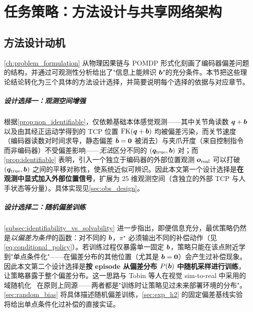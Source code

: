 
\chapter{任务策略：方法设计与共享网络架构}\label{ch:task_policy}

\section{方法设计动机}\label{sec:task_method_motivation}

\cref{ch:problem_formulation} 从物理因果链与 POMDP 形式化刻画了编码器偏差问题的结构，并通过可观测性分析给出了"信息上能辨识 $\bm{b}$"的充分条件。本节把这些理论结论转化为三个具体的方法设计选择，并简要说明每个选择的依据与对应章节。

\paragraph{设计选择一：观测空间增强} 根据\cref{prop:non_identifiable}，仅依赖基础本体感觉观测——其中关节角读数 $\bm{q}+\bm{b}$ 以及由其经正运动学得到的 TCP 位置 $\text{FK}(\bm{q}+\bm{b})$ 均被偏差污染，而关节速度（编码器读数对时间求导，静态偏差 $\dot{\bm{b}}=\bm{0}$ 被消去）与夹爪开度（来自控制指令而非编码器）不受偏差影响——\emph{无法}区分不同的 $(\bm{q}_{\text{true}}, \bm{b})$ 对；而\cref{prop:identifiable} 表明，引入一个独立于编码器的外部位置观测 $\bm{o}_{\text{real}}$ 可以打破 $(\bm{q}_{\text{true}}, \bm{b})$ 之间的平移对称性，使系统近似可辨识。因此本文第一个设计选择是\textbf{在观测中显式加入外部位置信号}，扩展为 25 维观测空间（含独立的外部 TCP 与人手状态等分量）。具体实现见\cref{sec:obs_design}。

\paragraph{设计选择二：随机偏差训练} \cref{subsec:identifiability_vs_solvability} 进一步指出，即便信息充分，最优策略仍然是\emph{以偏差为条件}的函数：对不同的 $\bm{b}$，$\pi^\star$ 必须输出不同的补偿动作（见\cref{eq:conditional_policy}）。若训练过程仅暴露单一固定 $\bm{b}$，策略只能在该点附近学到"单点条件化"——在偏差分布的其他位置（尤其是 $\bm{b}=\bm{0}$）会产生过补偿现象。因此本文第二个设计选择是\textbf{按 episode 从偏差分布 $P(\bm{b})$ 中随机采样进行训练}，让策略暴露于整个偏差分布。这一思路与 Tobin 等人在视觉 sim-to-real 中采用的域随机化~\cite{tobin2017domain} 在原则上同源——两者都是"训练时让策略见过未来部署环境的分布"。\cref{sec:random_bias} 将具体描述随机偏差训练，\cref{sec:exp_h2} 的固定偏差基线实验将给出单点条件化过补偿的直接实证。

